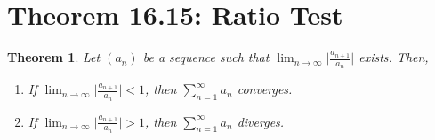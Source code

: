 \documentclass[openany, amssymb, psamsfonts]{amsart}
\newcommand{\abs}[1]{\lvert #1 \rvert}
\newtheorem{thm}{Theorem}[section]
\theoremstyle{definition}
\numberwithin{equation}{section}
\begin{document}
\section*{Theorem 16.15: Ratio Test}
\begin{thm}
\label{16.15}
	Let $(a_n)$ be a sequence such that $\displaystyle\lim_{n \to \infty} \abs{\frac{a_{n+1}}{a_n}}$ exists. Then,
	\begin{enumerate}
		\item[a)] If 
		$\displaystyle \lim_{n \to \infty} \abs{\frac{a_{n + 1}}{a_{n}}} < 1$,
		then $\displaystyle\sum_{n = 1}^{\infty} a_n$ converges.
		\item[b)] If 
		$\displaystyle \lim_{n \to \infty} \abs{\frac{a_{n + 1}}{a_{n}}} > 1$,
		then $\displaystyle\sum_{n = 1}^{\infty} a_n$ diverges.
	\end{enumerate}
\end{thm}
\end{document}
